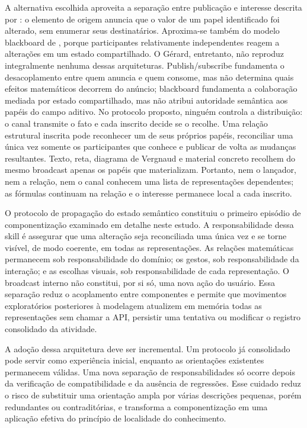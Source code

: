 \documentclass[preprint,12pt,authoryear]{elsarticle}
\newcommand{\gerard}{Gérard\xspace}
\begin{document}
A alternativa escolhida aproveita a separação entre publicação e interesse descrita por \citet{eugster2003many}: o elemento de origem anuncia que o valor de um papel identificado foi alterado, sem enumerar seus destinatários. Aproxima-se também do modelo blackboard de \citet{nii1986blackboard}, porque participantes relativamente independentes reagem a alterações em um estado compartilhado. O \gerard, entretanto, não reproduz integralmente nenhuma dessas arquiteturas. Publish/subscribe fundamenta o desacoplamento entre quem anuncia e quem consome, mas não determina quais efeitos matemáticos decorrem do anúncio; blackboard fundamenta a colaboração mediada por estado compartilhado, mas não atribui autoridade semântica aos papéis do campo aditivo. No protocolo proposto, ninguém controla a distribuição: o canal transmite o fato e cada inscrito decide se o recolhe. Uma relação estrutural inscrita pode reconhecer um de seus próprios papéis, reconciliar uma única vez somente os participantes que conhece e publicar de volta as mudanças resultantes. Texto, reta, diagrama de Vergnaud e material concreto recolhem do mesmo broadcast apenas os papéis que materializam. Portanto, nem o lançador, nem a relação, nem o canal conhecem uma lista de representações dependentes; as fórmulas continuam na relação e o interesse permanece local a cada inscrito.

O protocolo de propagação do estado semântico constituiu o primeiro episódio de componentização examinado em detalhe neste estudo. A responsabilidade dessa skill é assegurar que uma alteração seja reconciliada uma única vez e se torne visível, de modo coerente, em todas as representações. As relações matemáticas permanecem sob responsabilidade do domínio; os gestos, sob responsabilidade da interação; e as escolhas visuais, sob responsabilidade de cada representação. O broadcast interno não constitui, por si só, uma nova ação do usuário. Essa separação reduz o acoplamento entre componentes e permite que movimentos exploratórios posteriores à modelagem atualizem em memória todas as representações sem chamar a API, persistir uma tentativa ou modificar o registro consolidado da atividade.

A adoção dessa arquitetura deve ser incremental. Um protocolo já consolidado pode servir como experiência inicial, enquanto as orientações existentes permanecem válidas. Uma nova separação de responsabilidades só ocorre depois da verificação de compatibilidade e da ausência de regressões. Esse cuidado reduz o risco de substituir uma orientação ampla por várias descrições pequenas, porém redundantes ou contraditórias, e transforma a componentização em uma aplicação efetiva do princípio de localidade do conhecimento.
\end{document}
